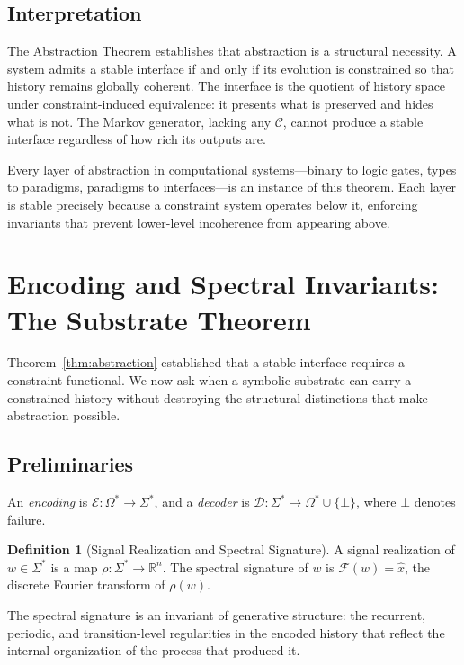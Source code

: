 \documentclass[12pt, a4paper]{article}
\theoremstyle{plain}
\theoremstyle{definition}
\newtheorem{definition}[theorem]{Definition}
\theoremstyle{remark}
\begin{document}
\subsection{Interpretation}

The Abstraction Theorem establishes that abstraction is a structural necessity. A system admits a stable interface if and only if its evolution is constrained so that history remains globally coherent. The interface is the quotient of history space under constraint-induced equivalence: it presents what is preserved and hides what is not. The Markov generator, lacking any $\mathcal{C}$, cannot produce a stable interface regardless of how rich its outputs are.

Every layer of abstraction in computational systems---binary to logic gates, types to paradigms, paradigms to interfaces---is an instance of this theorem. Each layer is stable precisely because a constraint system operates below it, enforcing invariants that prevent lower-level incoherence from appearing above.

\section{Encoding and Spectral Invariants: The Substrate Theorem}

Theorem~\ref{thm:abstraction} established that a stable interface requires a constraint functional. We now ask when a symbolic substrate can carry a constrained history without destroying the structural distinctions that make abstraction possible.

\subsection{Preliminaries}

An \emph{encoding} is $\mathcal{E} : \Omega^* \to \Sigma^*$, and a \emph{decoder} is $\mathcal{D} : \Sigma^* \to \Omega^* \cup \{\bot\}$, where $\bot$ denotes failure.

\begin{definition}[Signal Realization and Spectral Signature]
A signal realization of $w \in \Sigma^*$ is a map $\rho : \Sigma^* \to \mathbb{R}^n$. The spectral signature of $w$ is $\mathcal{F}(w) = \hat{x}$, the discrete Fourier transform of $\rho(w)$.
\end{definition}

The spectral signature is an invariant of generative structure: the recurrent, periodic, and transition-level regularities in the encoded history that reflect the internal organization of the process that produced it.
\end{document}
